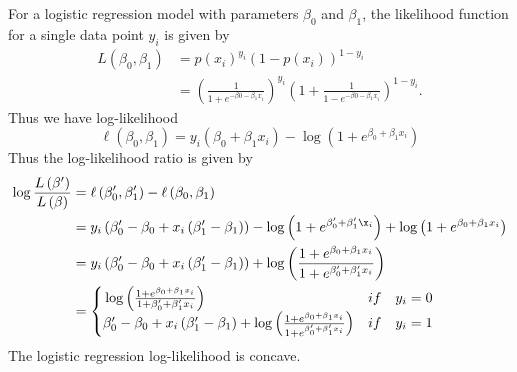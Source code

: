 For a logistic regression model with parameters $\beta_0$ and $\beta_1$, the likelihood function for a single data point $y_i$ is given by 
\begin{equation}\label{eq:logist_likelihood}
\begin{split}
    L\left(\beta_0, \beta_1\right) &= p\left(x_i\right)^{y_i} \left(1 - p\left(x_i\right)\right)^{1-y_i} \\
    &= \left(\frac{1}{1 +  e^{-\beta0 -\beta_1 x_i}}\right)^{y_i} \left(1 +  \frac{1}{1 -  e^{-\beta0 -\beta_1 x_i}}\right)^{1 - y_i}. 
\end{split}
\end{equation}
Thus we have log-likelihood 
\begin{equation}\label{eq:logist_loglik_example}
   \ell\left(\beta_0, \beta_1\right) =   y_i\left(\beta_0 + \beta_1 x_i \right) - \log \left( 1 + e^{\beta_0  + \beta_1 x_i }\right)
   \end{equation}
Thus the log-likelihood ratio is given by 
\begin{equation}
\begin{split}
    \log\frac{L\left(\beta'\right)}{L\left(\beta\right)} &= \ell\left(\beta_0', \beta_1'\right) -  \ell \left(\beta_0,\beta_1\right)\\
    & = y_i\left(\beta_0' - \beta_0 + x_i \left(\beta_1' - \beta_1\right)\right) - \log \left(1 + e^{\beta_0' + \beta_1' \x_i}\right) + \log \left(1 + e^{\beta_0 +  \beta_1 x_i}\right) \\
    & = y_i\left(\beta_0' - \beta_0 + x_i\left(\beta_1' - \beta_1\right)\right) + \log \left(\frac{1 + e^{\beta_0 + \beta_1 x_i}}{1 + e^{\beta_0' + \beta_1' x_i}}\right) 
    \\
    & = \begin{cases}{} 
        \log \left(\frac{1 + e^{\beta_0 + \beta_1 x_i}}{1 + \beta_0' + \beta_1' x_i}\right) & if \quad y_i = 0 \\
        \beta_0' - \beta_0 + x_i \left(\beta_1' - \beta_1\right) + \log \left(\frac{1 + e^{\beta_0 + \beta_1 x_i}}{1 + e^{\beta_0' + \beta_1'x_i}}\right)  & if \quad y_i = 1
    \end{cases}
\end{split}
\end{equation}
The logistic regression log-likelihood is concave. 


